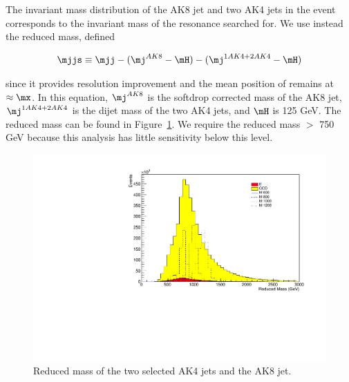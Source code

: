 The invariant \mjj mass distribution of the AK8 jet and two AK4 jets in the event corresponds to the invariant mass of the resonance searched for. We use instead the reduced mass, defined
\begin{linenomath}
\begin{equation}
\mjjs \equiv \mjj - (\mj^{AK8}-\mH) - (\mj^{1AK4 + 2AK4}-\mH)
\label{eq:Mjjs}
\end{equation}
\end{linenomath}
since it provides resolution improvement and the mean position of \mjjs remains at $\approx \mx$. In this equation, $\mj^{AK8}$ is the softdrop corrected mass of the AK8 jet, $\mj^{1AK4 + 2AK4}$ is the dijet mass of the two AK4 jets, and $\mH$ is 125 GeV. The reduced mass can be found in Figure~\ref{fig:redm}.
We require the reduced mass $>$ 750 GeV because this analysis has little sensitivity below this level.

\begin{figure}[h]
\begin{center}
\includegraphics[scale=0.5]{F5/shaperedmass.pdf}
\end{center}
\caption{Reduced mass of the two selected AK4 jets and the AK8 jet.}
\label{fig:redm}
\end{figure} 

